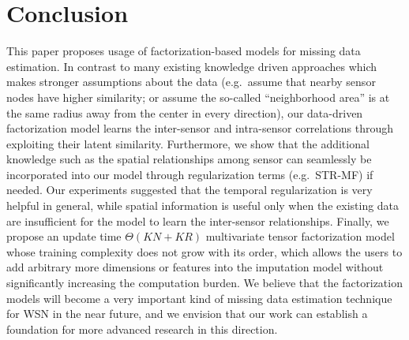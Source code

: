 \section{Conclusion}  \label{sec:conc}
This paper proposes usage of factorization-based models for missing data estimation.
In contrast to many existing knowledge driven approaches which makes stronger assumptions about the data (e.g.\ assume that nearby sensor nodes have higher similarity; or assume the so-called ``neighborhood area'' is at the same radius away from the center in every direction), our data-driven factorization model learns the inter-sensor and intra-sensor correlations through exploiting their latent similarity.
Furthermore, we show that the additional knowledge such as the spatial relationships among sensor can seamlessly be incorporated into our model through regularization terms (e.g.\ STR-MF) if needed.
Our experiments suggested that the temporal regularization is very helpful in general, while spatial information is useful only when the existing data are insufficient for the model to learn the inter-sensor relationships.
Finally, we propose an update time $\Theta(KN + KR)$ multivariate tensor factorization model whose training complexity does not grow with its order, which allows the users to add arbitrary more dimensions or features into the imputation model without significantly increasing the computation burden.
We believe that the factorization models will become a very important kind of missing data estimation technique for WSN in the near future, and we envision that our work can establish a foundation for more advanced research in this direction.
